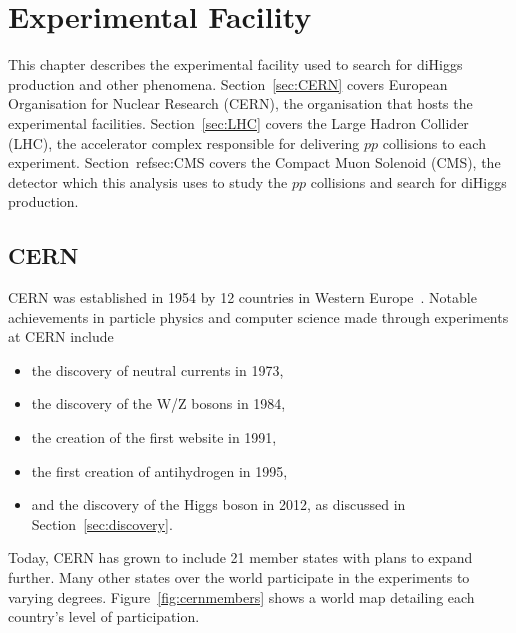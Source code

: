 
\chapter{Experimental Facility\label{ch:experiment}}

This chapter describes the experimental facility used to search for diHiggs production and other phenomena. Section~\ref{sec:CERN} covers European Organisation for Nuclear Research (CERN), the organisation
that hosts the experimental facilities. Section~\ref{sec:LHC} covers the Large Hadron Collider (LHC), the accelerator complex responsible for delivering $pp$ collisions to each experiment. Section~ref{sec:CMS}
covers the Compact Muon Solenoid (CMS), the detector which this analysis uses to study the $pp$ collisions and search for diHiggs production.


\section{CERN\label{sec:CERN}}

CERN was established in 1954 by 12 countries in Western Europe~\cite{cern:public}. Notable
achievements in particle physics and computer science made through experiments at CERN include

\begin{itemize}
\item the discovery of neutral currents in 1973,
\item the discovery of the W/Z bosons in 1984,
\item the creation of the first website in 1991,
\item the first creation of antihydrogen in 1995,
\item and the discovery of the Higgs boson in 2012, as discussed in Section~\ref{sec:discovery}.
\end{itemize}

Today, CERN has grown to include 21 member states with plans to expand further. Many other states
over the world participate in the experiments to varying degrees. Figure~\ref{fig:cernmembers}
shows a world map detailing each country's level of participation. 


